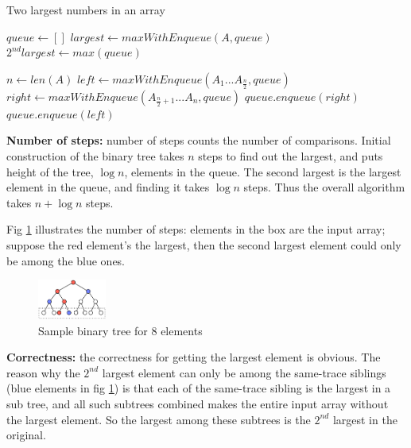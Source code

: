 \documentclass{article}
\begin{document}
\begin{description}
  \begin{algorithm}[H]
  \caption{Two largest numbers in an array}
  \label{alg:largest-second-largest-number}
    \begin{algorithmic}[1]
    
      \State $queue \gets []$
      \State $largest \gets maxWithEnqueue(A, queue)$
      \State $2^{nd}largest \gets max(queue)$
      \State {}
    \EndFunction

        \State {}
      \EndIf
      \State $n \gets len(A)$
      \State $left \gets maxWithEnqueue(A_1...A_{\frac{n}{2}}, queue)$
      \State $right \gets maxWithEnqueue(A_{\frac{n}{2} + 1}...A_n, queue)$
        \State $queue.enqueue(right)$
        \State {}
      \Else
        \State $queue.enqueue(left)$
        \State {}
      \EndIf
    \EndFunction

    \end{algorithmic}
  \end{algorithm}

  \textbf{Number of steps:} number of steps counts the number of comparisons. Initial construction of the binary tree takes $n$ steps to find out the largest, and puts height of the tree, $\log n$, elements in the queue. The second largest is the largest element in the queue, and finding it takes $\log n$ steps. Thus the overall algorithm takes $n + \log n$ steps. 

  Fig \ref{fig:pb2} illustrates the number of steps: elements in the box are the input array; suppose the red element's the largest, then the second largest element could only be among the blue ones. 

  \begin{figure}[h]
  \centering
  \includegraphics[width=0.2\textwidth]{hw72tree}
  \caption{Sample binary tree for 8 elements}
  \label{fig:pb2}
  \end{figure}

  \textbf{Correctness:} the correctness for getting the largest element is obvious. The reason why the $2^{nd}$ largest element can only be among the same-trace siblings (blue elements in fig \ref{fig:pb2}) is that each of the same-trace sibling is the largest in a sub tree, and all such subtrees combined makes the entire input array without the largest element. So the largest among these subtrees is the $2^{nd}$ largest in the original.


\end{description}
\end{document}
